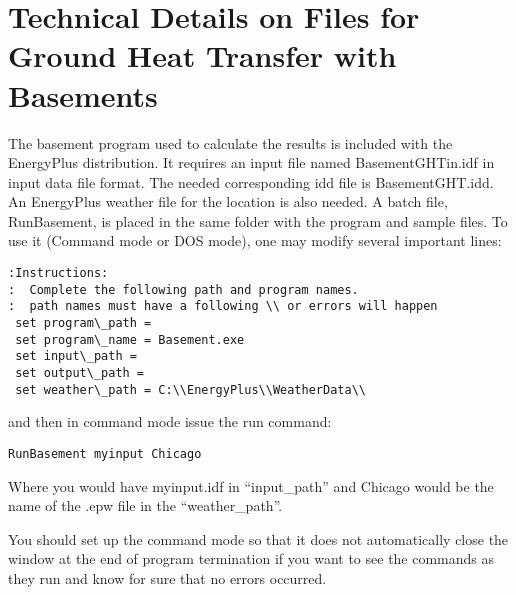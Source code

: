 \section{Technical Details on Files for Ground Heat Transfer with Basements}\label{technical-details-on-files-for-ground-heat-transfer-with-basements}

The basement program used to calculate the results is included with the EnergyPlus distribution. It requires an input file named BasementGHTin.idf in input data file format. The needed corresponding idd file is BasementGHT.idd. An EnergyPlus weather file for the location is also needed. A batch file, RunBasement, is placed in the same folder with the program and sample files. To use it (Command mode or DOS mode), one may modify several important lines:

\begin{lstlisting}
:Instructions:
:  Complete the following path and program names.
:  path names must have a following \\ or errors will happen
 set program\_path =
 set program\_name = Basement.exe
 set input\_path =
 set output\_path =
 set weather\_path = C:\\EnergyPlus\\WeatherData\\
\end{lstlisting}

and then in command mode issue the run command:

\begin{lstlisting}
RunBasement myinput Chicago
\end{lstlisting}

Where you would have myinput.idf in ``input\_path'' and Chicago would be the name of the .epw file in the ``weather\_path''.

You should set up the command mode so that it does not automatically close the window at the end of program termination if you want to see the commands as they run and know for sure that no errors occurred.
